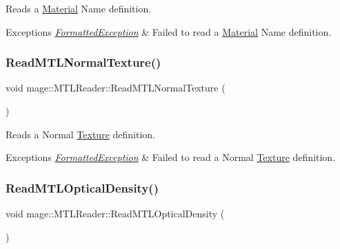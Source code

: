 Reads a \hyperlink{structmage_1_1_material}{Material} Name definition.


\begin{DoxyExceptions}{Exceptions}
{\em \hyperlink{structmage_1_1_formatted_exception}{Formatted\+Exception}} & Failed to read a \hyperlink{structmage_1_1_material}{Material} Name definition. \\
\hline
\end{DoxyExceptions}
\hypertarget{classmage_1_1_m_t_l_reader_ae44a5704a09edb722f99a480a58c807a}{}\label{classmage_1_1_m_t_l_reader_ae44a5704a09edb722f99a480a58c807a} 
\subsubsection{\texorpdfstring{Read\+M\+T\+L\+Normal\+Texture()}{ReadMTLNormalTexture()}}
{\footnotesize\ttfamily void mage\+::\+M\+T\+L\+Reader\+::\+Read\+M\+T\+L\+Normal\+Texture (\begin{DoxyParamCaption}{ }\end{DoxyParamCaption})\hspace{0.3cm}{\ttfamily [private]}}

Reads a Normal \hyperlink{classmage_1_1_texture}{Texture} definition.


\begin{DoxyExceptions}{Exceptions}
{\em \hyperlink{structmage_1_1_formatted_exception}{Formatted\+Exception}} & Failed to read a Normal \hyperlink{classmage_1_1_texture}{Texture} definition. \\
\hline
\end{DoxyExceptions}
\hypertarget{classmage_1_1_m_t_l_reader_a06576927d764c9cd2be41871f137fac4}{}\label{classmage_1_1_m_t_l_reader_a06576927d764c9cd2be41871f137fac4} 
\subsubsection{\texorpdfstring{Read\+M\+T\+L\+Optical\+Density()}{ReadMTLOpticalDensity()}}
{\footnotesize\ttfamily void mage\+::\+M\+T\+L\+Reader\+::\+Read\+M\+T\+L\+Optical\+Density (\begin{DoxyParamCaption}{ }\end{DoxyParamCaption})\hspace{0.3cm}{\ttfamily [private]}}

